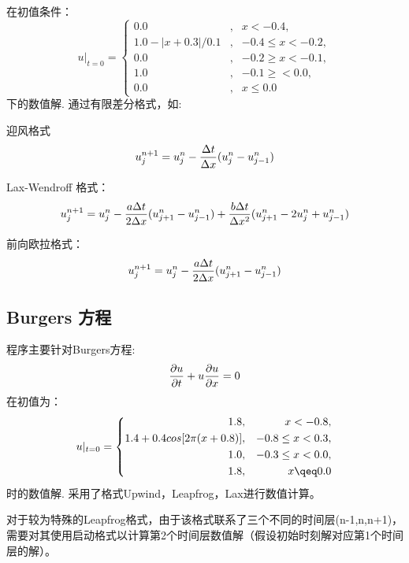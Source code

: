\documentclass{article}
\begin{document}
在初值条件：
\begin{equation}
\label{eq6}
u|_{t=0}=\left\{
\begin{aligned}
0.0 & , & x<-0.4, \\
1.0 - |x+0.3|/0.1 & , & -0.4 \leq x < -0.2, \\
0.0 & , & -0.2 \geq x < -0.1, \\
1.0 &, & -0.1 \geq < 0.0, \\
0.0 &, & x \leq 0.0
\end{aligned}
\right.
\end{equation}
下的数值解. 通过有限差分格式，如:

迎风格式
\begin{equation}
    u^{n+1}_{j} = u^n_j - {\Delta t\over\Delta x}(u^n_j - u^n_{j-1})
\end{equation}

Lax-Wendroff 格式：
\begin{equation}
    u^{n+1}_{j} = u^n_j - {a \Delta t\over 2\Delta x}(u^n_{j+1} - u^n_{j-1}) + {b \Delta t\over\Delta x^2}(u^n_{j+1} - 2u^n_j + u^n_{j-1})
\end{equation}

前向欧拉格式：
\begin{equation}
    u^{n+1}_{j} = u^n_j - {a \Delta t\over 2\Delta x}(u^n_{j+1} - u^n_{j-1})
\end{equation}


\subsection{Burgers 方程}
程序主要针对Burgers方程:
\begin{equation}
       {\partial u\over\partial t} + u{\partial u\over\partial x} = 0
\end{equation}
在初值为：
\begin{equation}
\label{eq6}
u|_{t=0}=\left\{
\begin{aligned}
1.8 & , & x<-0.8, \\
1.4 + 0.4cos[2\pi(x+0.8)] & , & -0.8 \leq x < 0.3, \\
1.0 & , & -0.3 \leq x < 0.0, \\
1.8 &, & x \qeq  0.0
\end{aligned}
\right.
\end{equation}
时的数值解. 采用了格式Upwind，Leapfrog，Lax进行数值计算。

对于较为特殊的Leapfrog格式，由于该格式联系了三个不同的时间层(n-1,n,n+1)，需要对其使用启动格式以计算第2个时间层数值解（假设初始时刻解对应第1个时间层的解）。
\end{document}
